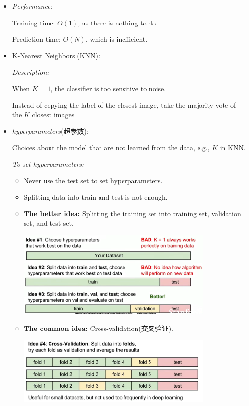 \documentclass{article}
\numberwithin{equation}{section}
\begin{document}
\begin{CJK}{UTF8}{gbsn}
\begin{enumerate}
\begin{itemize}
            \item \textit{Performance:}\par
            Training time: \(O(1)\), as there is nothing to do.\par
            Prediction time: \(O(N)\), which is inefficient.
        
            \item K-Nearest Neighbors (KNN):\par
            \textit{Description:} \par
            When \(K = 1\), the classifier is too sensitive to noise.\par
            Instead of copying the label of the closest image, take the majority vote of the \(K\) closest images.
            \item \textit{hyperparameters}(超参数):\par
            Choices about the model that are not learned from the data, e.g., \(K\) in KNN.\par
            \textit{To set hyperparameters:}\par
            \begin{itemize}
                \item Never use the test set to set hyperparameters.\par
                \item Splitting data into train and test is not enough.\par
                \item \textbf{The better idea:} Splitting the training set into training set, validation set, and test set.\par
                \includegraphics[width=0.8\textwidth]{images/Lecture2/ideas_for_hyperparameter.png}
                \item \textbf{The common idea:} Cross-validation(交叉验证).\par
                \includegraphics[width=0.8\textwidth]{images/Lecture2/cross_validation.png}
            \end{itemize}


\end{itemize}
\end{enumerate}
\end{CJK}
\end{document}
